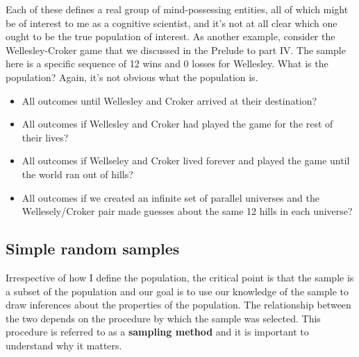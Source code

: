 \documentclass[
  a4paper,
]{book}
\providecommand{\tightlist}{%
  \setlength{\itemsep}{0pt}\setlength{\parskip}{0pt}}\usepackage{longtable,booktabs,array}
\begin{document}
Each of these defines a real group of mind-possessing entities, all of
which might be of interest to me as a cognitive scientist, and it's not
at all clear which one ought to be the true population of interest. As
another example, consider the Wellesley-Croker game that we discussed in
the Prelude to part IV. The sample here is a specific sequence of 12
wins and 0 losses for Wellesley. What is the population? Again, it's not
obvious what the population is.

\begin{itemize}
\tightlist
\item
  All outcomes until Wellesley and Croker arrived at their destination?
\item
  All outcomes if Wellesley and Croker had played the game for the rest
  of their lives?
\item
  All outcomes if Wellseley and Croker lived forever and played the game
  until the world ran out of hills?
\item
  All outcomes if we created an infinite set of parallel universes and
  the Wellesely/Croker pair made guesses about the same 12 hills in each
  universe?
\end{itemize}

\hypertarget{simple-random-samples}{%
\subsection{Simple random samples}\label{simple-random-samples}}

Irrespective of how I define the population, the critical point is that
the sample is a subset of the population and our goal is to use our
knowledge of the sample to draw inferences about the properties of the
population. The relationship between the two depends on the procedure by
which the sample was selected. This procedure is referred to as a
\textbf{sampling method} and it is important to understand why it
matters.
\end{document}
